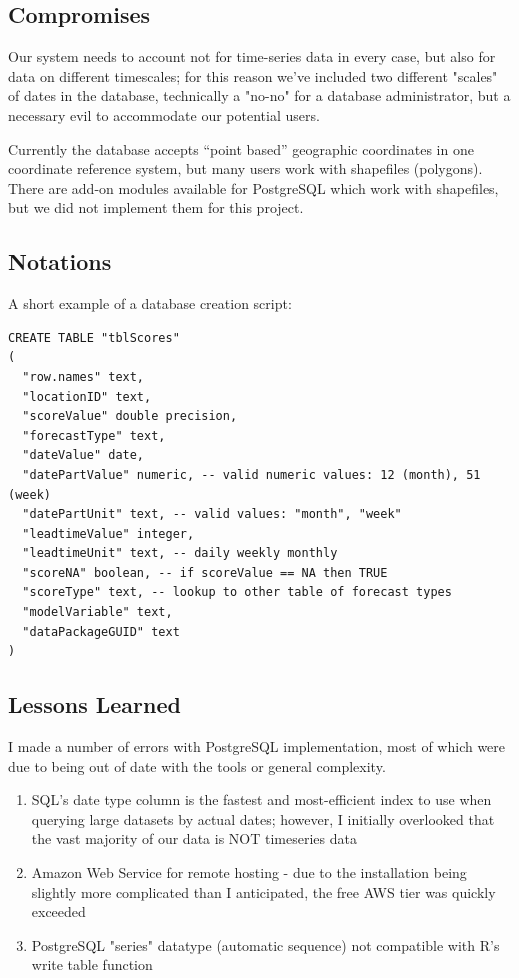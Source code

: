 \documentclass[logos,parttoc,morelanguage=french,morelanguage=german]{orsay-memoire}
\begin{document}
\subsection{Compromises}

Our system needs to account not for time-series data in every case, but also for data on different timescales; for this reason we've included two different "scales" of dates in the database, technically a "no-no" for a database administrator, but a necessary evil to accommodate our potential users.

Currently the database accepts ``point based'' geographic coordinates in one coordinate reference system, but many users work with shapefiles (polygons). There are add-on modules available for PostgreSQL which work with shapefiles, but we did not implement them for this project.

\subsection{Notations}

A short example of a database creation script:
\begin{verbatim}
CREATE TABLE "tblScores"
(
  "row.names" text,
  "locationID" text,
  "scoreValue" double precision,
  "forecastType" text,
  "dateValue" date,
  "datePartValue" numeric, -- valid numeric values: 12 (month), 51 (week)
  "datePartUnit" text, -- valid values: "month", "week"
  "leadtimeValue" integer,
  "leadtimeUnit" text, -- daily weekly monthly
  "scoreNA" boolean, -- if scoreValue == NA then TRUE
  "scoreType" text, -- lookup to other table of forecast types
  "modelVariable" text,
  "dataPackageGUID" text
)
\end{verbatim}

\subsection{Lessons Learned}

I made a number of errors with PostgreSQL implementation, most of which were due to being out of date with the tools or general complexity.
%
%

\begin{enumerate}
\item SQL's date type column is the fastest and most-efficient index to use when querying large datasets by actual dates; however, I initially overlooked that the vast majority of our data is NOT timeseries data
\item Amazon Web Service for remote hosting - due to the installation being slightly more complicated than I anticipated, the free AWS tier was quickly exceeded
\item PostgreSQL "series" datatype (automatic sequence) not compatible with R's write table function
\end{enumerate}
\end{document}
